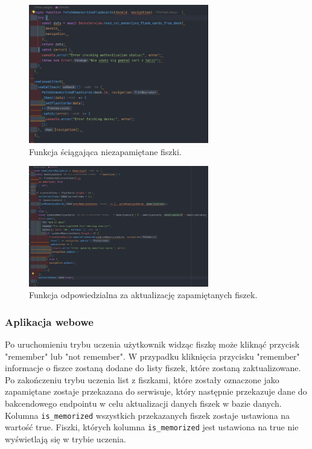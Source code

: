 \begin{figure}[H]
    \centering
    \includegraphics[width=0.7\textwidth]{chapters/chapter_8/screens/get_unmemorized_flash_cards_mobile}
    \caption{Funkcja ściągająca niezapamiętane fiszki.}
    \label{img:get_unmemorized_flash_cards_mobile}
\end{figure}

\begin{figure}[H]
    \centering
    \includegraphics[width=0.7\textwidth]{chapters/chapter_8/screens/update_unmemorized_flash_cards_mobile}
    \caption{Funkcja odpowiedzialna za aktualizację zapamiętanych fiszek.}
    \label{img:update_unmemorized_flash_cards_mobile}
\end{figure}

\subsubsection{Aplikacja webowe}

Po uruchomieniu trybu uczenia użytkownik widząc fiszkę może kliknąć przycisk "remember" lub "not remember". W przypadku kliknięcia przycisku "remember" informacje o fiszce zostaną dodane do listy fiszek, które zostaną zaktualizowane. Po zakończeniu trybu uczenia list z fiszkami, które zostały oznaczone jako zapamiętane zostaje przekazana do serwisuje, który następnie przekazuje dane do bakcendowego endpointu w celu aktualizacji danych fiszek w bazie danych. Kolumna \texttt{is\_memorized} wszystkich przekazanych fiszek zostaje ustawiona na wartość true. Fiszki, których kolumna \texttt{is\_memorized} jest ustawiona na true nie wyświetlają się w trybie uczenia.

